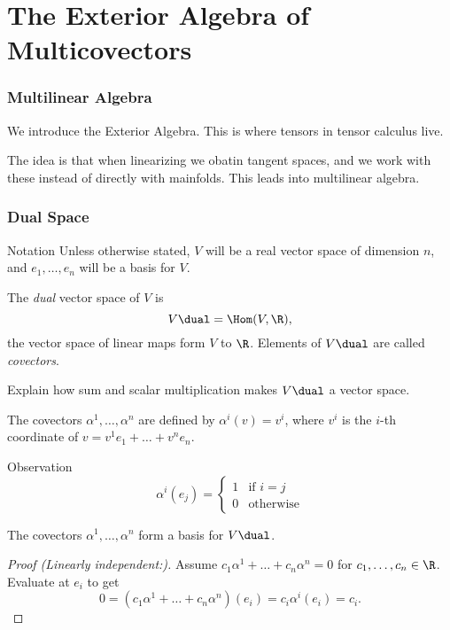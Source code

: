 \section{The Exterior Algebra of Multicovectors}
\begin{frame}
  \frametitle{Multilinear Algebra}
  We introduce the Exterior Algebra. This is where tensors in tensor calculus
  live.

  The idea is that when linearizing we obatin tangent spaces, and 
  we work with these instead of directly with mainfolds. This leads 
  into multilinear algebra.
\end{frame}
\begin{frame}
  \frametitle{Dual Space}
  \begin{block}
    {Notation}
    Unless otherwise stated, $V$ will be a real vector
    space of dimension $n$, and $e_1, \dots, e_n$ will be
    a basis for $V$.
  \end{block}
  \begin{definition}
    The {\em dual} vector space of $V$ is
    \begin{displaymath}
      V\dual = \Hom(V, \R),
    \end{displaymath}
    the vector space of linear maps form $V$ to $\R$.
    Elements of $V\dual$ are called {\em covectors}.
  \end{definition}
  \begin{exercise}
    Explain how sum and scalar multiplication makes $V\dual$ a vector space.
  \end{exercise}
\end{frame}

\begin{frame}
  The covectors $\alpha^1, \dots, \alpha^n$ are defined by $\alpha^i(v) = v^i$, 
  where $v^i$ is the $i$-th coordinate of $v = v^1 e_1 + \dots + v^n e_n$.
  \begin{block}
    {Observation}
    \begin{displaymath}
      \alpha^i(e_j) = 
      \begin{cases}
        1 & \text{if $i = j$} \\
        0 & \text{otherwise}
      \end{cases}
    \end{displaymath}
  \end{block}
    \begin{prop}
      The covectors $\alpha^1, \dots, \alpha^n$ form a basis for $V\dual$.
    \end{prop}
    \begin{proof}[Proof (Linearly independent:)]
      Assume $c_1 \alpha^1 + \dots + c_n \alpha^n = 0$
      for $c_1, \dots, c_n \in \R$. Evaluate at $e_i$ to get
      \begin{displaymath}
        0 = (c_1 \alpha^1 + \dots + c_n \alpha^n )(e_i) = c_i \alpha^i(e_i) =
        c_i.
      \end{displaymath}
    \end{proof}
\end{frame}

